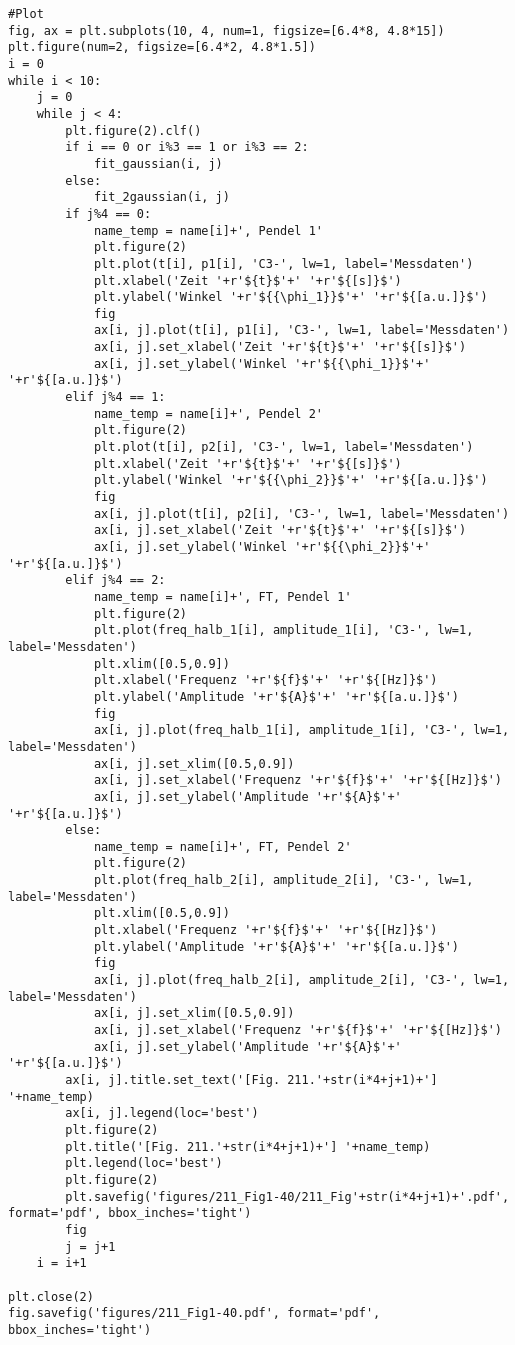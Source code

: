 \documentclass[a4paper,10pt]{article}
\begin{document}
\begin{lstlisting}
#Plot
fig, ax = plt.subplots(10, 4, num=1, figsize=[6.4*8, 4.8*15])
plt.figure(num=2, figsize=[6.4*2, 4.8*1.5])
i = 0
while i < 10:
    j = 0
    while j < 4:
        plt.figure(2).clf() 
        if i == 0 or i%3 == 1 or i%3 == 2:
            fit_gaussian(i, j)
        else:
            fit_2gaussian(i, j)
        if j%4 == 0:
            name_temp = name[i]+', Pendel 1'
            plt.figure(2)
            plt.plot(t[i], p1[i], 'C3-', lw=1, label='Messdaten')
            plt.xlabel('Zeit '+r'${t}$'+' '+r'${[s]}$')
            plt.ylabel('Winkel '+r'${{\phi_1}}$'+' '+r'${[a.u.]}$')
            fig
            ax[i, j].plot(t[i], p1[i], 'C3-', lw=1, label='Messdaten')
            ax[i, j].set_xlabel('Zeit '+r'${t}$'+' '+r'${[s]}$')
            ax[i, j].set_ylabel('Winkel '+r'${{\phi_1}}$'+' '+r'${[a.u.]}$')
        elif j%4 == 1:
            name_temp = name[i]+', Pendel 2'
            plt.figure(2)
            plt.plot(t[i], p2[i], 'C3-', lw=1, label='Messdaten')
            plt.xlabel('Zeit '+r'${t}$'+' '+r'${[s]}$')
            plt.ylabel('Winkel '+r'${{\phi_2}}$'+' '+r'${[a.u.]}$')
            fig
            ax[i, j].plot(t[i], p2[i], 'C3-', lw=1, label='Messdaten')
            ax[i, j].set_xlabel('Zeit '+r'${t}$'+' '+r'${[s]}$')
            ax[i, j].set_ylabel('Winkel '+r'${{\phi_2}}$'+' '+r'${[a.u.]}$')
        elif j%4 == 2:
            name_temp = name[i]+', FT, Pendel 1'
            plt.figure(2)
            plt.plot(freq_halb_1[i], amplitude_1[i], 'C3-', lw=1, label='Messdaten')
            plt.xlim([0.5,0.9])
            plt.xlabel('Frequenz '+r'${f}$'+' '+r'${[Hz]}$')
            plt.ylabel('Amplitude '+r'${A}$'+' '+r'${[a.u.]}$')
            fig
            ax[i, j].plot(freq_halb_1[i], amplitude_1[i], 'C3-', lw=1, label='Messdaten')
            ax[i, j].set_xlim([0.5,0.9])
            ax[i, j].set_xlabel('Frequenz '+r'${f}$'+' '+r'${[Hz]}$')
            ax[i, j].set_ylabel('Amplitude '+r'${A}$'+' '+r'${[a.u.]}$')
        else:
            name_temp = name[i]+', FT, Pendel 2'
            plt.figure(2)
            plt.plot(freq_halb_2[i], amplitude_2[i], 'C3-', lw=1, label='Messdaten')
            plt.xlim([0.5,0.9])
            plt.xlabel('Frequenz '+r'${f}$'+' '+r'${[Hz]}$')
            plt.ylabel('Amplitude '+r'${A}$'+' '+r'${[a.u.]}$')
            fig
            ax[i, j].plot(freq_halb_2[i], amplitude_2[i], 'C3-', lw=1, label='Messdaten')
            ax[i, j].set_xlim([0.5,0.9])
            ax[i, j].set_xlabel('Frequenz '+r'${f}$'+' '+r'${[Hz]}$')
            ax[i, j].set_ylabel('Amplitude '+r'${A}$'+' '+r'${[a.u.]}$')
        ax[i, j].title.set_text('[Fig. 211.'+str(i*4+j+1)+'] '+name_temp)
        ax[i, j].legend(loc='best')
        plt.figure(2)
        plt.title('[Fig. 211.'+str(i*4+j+1)+'] '+name_temp)
        plt.legend(loc='best')
        plt.figure(2)
        plt.savefig('figures/211_Fig1-40/211_Fig'+str(i*4+j+1)+'.pdf', format='pdf', bbox_inches='tight')
        fig
        j = j+1
    i = i+1

plt.close(2)
fig.savefig('figures/211_Fig1-40.pdf', format='pdf', bbox_inches='tight')
\end{lstlisting}
\end{document}
